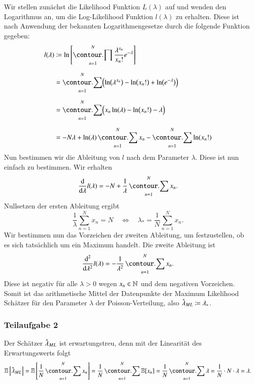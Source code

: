 Wir stellen zunächst die Likelihood Funktion $L(\lambda)$ auf und wenden den Logarithmus an, um die Log-Likelihood Funktion $l(\lambda)$ zu erhalten. Diese ist nach Anwendung der bekannten Logarithmengesetze durch die folgende Funktion gegeben:
\begin{align*}
	l(\lambda)
		&\coloneqq \ln\left[ \prod_{n=1}^N \frac{\lambda^{x_n}}{x_n!} e^{-\lambda} \right]
\\[2mm]
		&= \sum_{n=1}^N \Bigl( \ln\bigl( \lambda^{x_n} \bigr) - \ln\bigl( x_n! \bigr) +  \ln\bigl( e^{-\lambda} \bigr) \Bigr)
\\[2mm]
		&= \sum_{n=1}^N \Bigl( x_n \ln(\lambda) - \ln\bigl( x_n! \bigr) -\lambda \Bigr)
\\[2mm]
		&= -N \lambda + \ln(\lambda) \sum_{n=1}^N x_n - \sum_{n=1}^N \ln(x_n!)
\end{align*}
Nun bestimmen wir die Ableitung von $l$ nach dem Parameter $\lambda$. Diese ist nun einfach zu bestimmen. Wir erhalten
\begin{equation*}
	\frac{\diff}{\diff \lambda} l(\lambda)
		= -N + \frac{1}{\lambda} \sum_{n=1}^N x_n.
\end{equation*}
Nullsetzen der ersten Ableitung ergibt
\begin{equation*}
	\frac{1}{\lambda} \sum_{n=1}^N x_n = N
\quad\Longleftrightarrow\quad
	\lambda_* = \frac{1}{N} \sum_{n=1}^N x_n.
\end{equation*}
Wir bestimmen nun das Vorzeichen der zweiten Ableitung, um festzustellen, ob es sich tatsächlich um ein Maximum handelt. Die zweite Ableitung ist
\begin{equation*}
	\frac{\diff^2}{\diff \lambda^2} l(\lambda)
		= -\frac{1}{\lambda^2} \sum_{n=1}^N x_n.
\end{equation*}
Diese ist negativ für alle $\lambda > 0$ wegen $x_n \in \mathbb{N}$ und dem negativen Vorzeichen. Somit ist das arithmetische Mittel der Datenpunkte der Maximum Likelihood Schätzer für den Parameter $\lambda$ der Poisson-Verteilung, also $\hat{\lambda}_{ML} \coloneqq \lambda_*$.

\subsubsection*{Teilaufgabe 2}

Der Schätzer $\hat{\lambda}_{ML}$ ist erwartungstreu, denn mit der Linearität des Erwartungswerts folgt
\begin{equation*}
	\E\left[ \lambdaML \right]
		= \E\left[ \frac{1}{N} \sum_{n=1}^N x_n \right]
		= \frac{1}{N} \sum_{n=1}^N \E[x_n]
		= \frac{1}{N} \sum_{n=1}^N \lambda
		= \frac{1}{N} \cdot N \cdot \lambda
		= \lambda.
\end{equation*}


